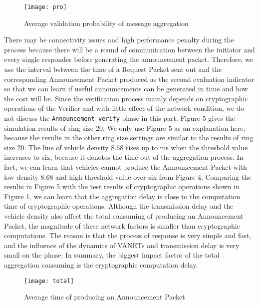 \documentclass[a4paper]{article}
\begin{document}
\begin{figure}
  \centering
  \texttt{[image: pro]}
  \caption{Average validation probability of message aggregation}
\end{figure}

There may be connectivity issues and high performance penalty during the process because there will be a round of communication between the initiator and every single responder before generating the announcement packet. Therefore, we use the interval between the time of a Request Packet sent out and the corresponding Announcement Packet produced as the second evaluation indicator so that we can learn if useful announcements can be generated in time and how the cost will be. Since the verification process mainly depends on cryptographic operations of the Verifier and with little effect of the network condition, we do not discuss the \texttt{Announcement verify} phase in this part. Figure 5 gives the simulation results of ring size 20. We only use Figure 5 as an explanation here, because the results in the other ring size settings are similar to the results of ring size 20. The line of vehicle density 8.68 rises up to ms when the threshold value increases to six, because it denotes the time-out of the aggregation process. In fact, we can learn that vehicles cannot produce the Announcement Packet with low density 8.68 and high threshold value over six from Figure 4. Comparing the results in Figure 5 with the test results of cryptographic operations shown in Figure 1, we can learn that the aggregation delay is close to the computation time of cryptographic operations. Although the transmission delay and the vehicle density also affect the total consuming of producing an Announcement Packet, the magnitude of these network factors is smaller than cryptographic computations. The reason is that the process of response is very simple and fast, and the influence of the dynamics of VANETs and transmission delay is very small on the phase. In summary, the biggest impact factor of the total aggregation consuming is the cryptographic computation delay.

\begin{figure}
  \centering
  \texttt{[image: total]}
  \caption{Average time of producing an Announcement Packet}
\end{figure}
\end{document}
